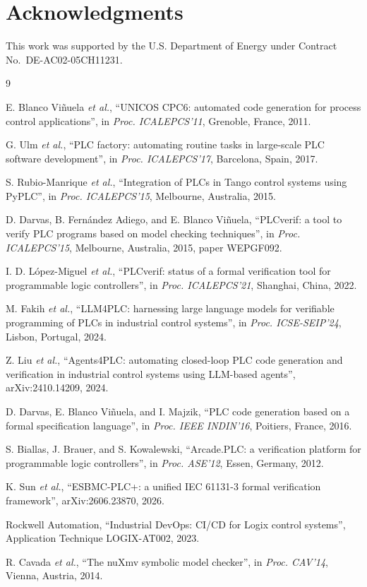 \documentclass[letterpaper]{jacow}
\begin{document}
\section{Acknowledgments}

This work was supported by the U.S. Department of Energy under
Contract No.\ DE-AC02-05CH11231.

\begin{thebibliography}{9}

E. Blanco Vi\~nuela \emph{et al.}, ``UNICOS CPC6: automated code
generation for process control applications'', in \emph{Proc.
ICALEPCS'11}, Grenoble, France, 2011.

G. Ulm \emph{et al.}, ``PLC factory: automating routine tasks in
large-scale PLC software development'', in \emph{Proc. ICALEPCS'17},
Barcelona, Spain, 2017.

S. Rubio-Manrique \emph{et al.}, ``Integration of PLCs in Tango
control systems using PyPLC'', in \emph{Proc. ICALEPCS'15},
Melbourne, Australia, 2015.

D. Darvas, B. Fern\'andez Adiego, and E. Blanco Vi\~nuela,
``PLCverif: a tool to verify PLC programs based on model checking
techniques'', in \emph{Proc. ICALEPCS'15}, Melbourne, Australia,
2015, paper WEPGF092.

I. D. L\'opez-Miguel \emph{et al.}, ``PLCverif: status of a formal
verification tool for programmable logic controllers'', in
\emph{Proc. ICALEPCS'21}, Shanghai, China, 2022.

M. Fakih \emph{et al.}, ``LLM4PLC: harnessing large language models
for verifiable programming of PLCs in industrial control systems'',
in \emph{Proc. ICSE-SEIP'24}, Lisbon, Portugal, 2024.

Z. Liu \emph{et al.}, ``Agents4PLC: automating closed-loop PLC code
generation and verification in industrial control systems using
LLM-based agents'', arXiv:2410.14209, 2024.

D. Darvas, E. Blanco Vi\~nuela, and I. Majzik, ``PLC code generation
based on a formal specification language'', in \emph{Proc. IEEE
INDIN'16}, Poitiers, France, 2016.

S. Biallas, J. Brauer, and S. Kowalewski, ``Arcade.PLC: a
verification platform for programmable logic controllers'', in
\emph{Proc. ASE'12}, Essen, Germany, 2012.

K. Sun \emph{et al.}, ``ESBMC-PLC+: a unified IEC 61131-3 formal
verification framework'', arXiv:2606.23870, 2026.

Rockwell Automation, ``Industrial DevOps: CI/CD for Logix control
systems'', Application Technique LOGIX-AT002, 2023.

R. Cavada \emph{et al.}, ``The nuXmv symbolic model checker'', in
\emph{Proc. CAV'14}, Vienna, Austria, 2014.

\end{thebibliography}
\end{document}
